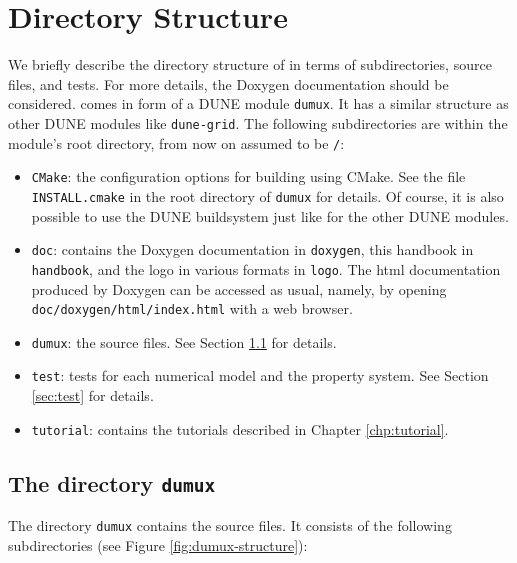 \chapter{Directory Structure}

We briefly describe the directory structure of \Dumux in terms 
of subdirectories, source files, and tests. For more details, 
the Doxygen documentation should be considered. 
\Dumux comes in form of a DUNE module \texttt{dumux}. 
It has a similar structure as other DUNE modules like \texttt{dune-grid}. 
The following subdirectories are within the module's root directory, 
from now on assumed to be \texttt{/}: 
\begin{itemize} 
\item \texttt{CMake}: the configuration options 
for building \Dumux using CMake. See the file \texttt{INSTALL.cmake} in 
the root directory of \texttt{dumux} for details. Of course, 
it is also possible to use the DUNE buildsystem just like for the other 
DUNE modules.
\item \texttt{doc}: contains the Doxygen documentation in \texttt{doxygen}, 
this handbook in \texttt{handbook}, and the \Dumux logo in various formats in 
\texttt{logo}. The html documentation produced by Doxygen can be accessed as usual, 
namely, by opening \texttt{doc/doxygen/html/index.html} with a web browser. 
\item \texttt{dumux}: the \Dumux source files. See Section \ref{sec:dumux} for details. 
\item \texttt{test}: tests for each numerical model and the property system. 
See Section \ref{sec:test} for details. 
\item \texttt{tutorial}: contains the tutorials described in Chapter \ref{chp:tutorial}. 
\end{itemize}



\section{The directory \texttt{dumux}}\label{sec:dumux}

The directory \texttt{dumux} contains the \Dumux source files. It consists of the following subdirectories (see Figure \ref{fig:dumux-structure}): 

